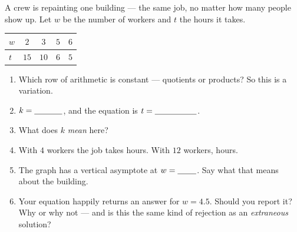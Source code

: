 \documentclass[10pt]{article}
\begin{document}
\begin{practicebox}
A crew is repainting one building --- the same job, no matter how many people show up. Let $w$ be the
number of workers and $t$ the hours it takes.
\begin{center}
\renewcommand{\arraystretch}{1.3}
\begin{tabular}{|l|c|c|c|c|}
\hline
\rowcolor{forestbg}
$w$ & $2$ & $3$ & $5$ & $6$ \\ \hline
$t$ & $15$ & $10$ & $6$ & $5$ \\ \hline
\end{tabular}
\end{center}
\begin{enumerate}[leftmargin=1.7em, itemsep=6pt]
  \item Which row of arithmetic is constant --- quotients or products? \blank{2.4cm} \; So this is a
        \blank{2.4cm} variation.
  \item $k=\blank{1.2cm}$, and the equation is $t=\blank{1.8cm}$.
  \item What does $k$ \emph{mean} here? \blank{6.0cm}
  \item With $4$ workers the job takes \blank{1.6cm} hours. With $12$ workers, \blank{1.6cm} hours.
  \item The graph has a vertical asymptote at $w=\blank{0.8cm}$. Say what that means about the
        building. \writeline
  \item Your equation happily returns an answer for $w=4.5$. Should you report it? Why or why not ---
        and is this the same kind of rejection as an \emph{extraneous} solution? \writeline
\end{enumerate}
\end{practicebox}
\end{document}
